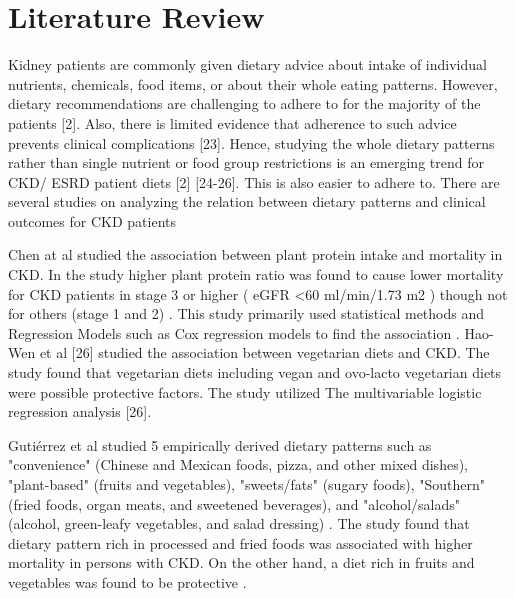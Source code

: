 \section*{Literature Review}

Kidney patients are commonly given dietary advice about intake of individual nutrients, chemicals, food items, or about their whole eating patterns. However, dietary recommendations are challenging to adhere to for the majority of the patients [2]. Also, there is limited evidence that adherence to such advice prevents clinical complications [23]. Hence, studying the whole dietary patterns rather than single nutrient or food group restrictions is an emerging trend for CKD/ ESRD patient diets [2] [24-26]. This is also easier to adhere to. There are several studies on analyzing the relation between dietary patterns and clinical outcomes for CKD patients \cite{Jaceketal2017} \cite{Chenetal2016}  \cite{Gutierreztal2014}   \cite{Huangetal2013}   \cite{Muntneretal2013}  \cite{Ricardoetal2013} \cite{Tsuruyaetal2015}   \cite{Ricardoetal2015} 

\noindent Chen at al \cite{Chenetal2016} studied the association between plant protein intake and mortality in CKD. In the study higher plant protein ratio was found to cause lower mortality for CKD patients in stage 3 or higher ( eGFR  \textless 60 ml/min/1.73 m2 ) though not for others (stage 1 and 2) \cite{Chenetal2016}. This study primarily used statistical methods and Regression Models such as Cox regression models to find the association \cite{Chenetal2016}. Hao-Wen et al [26] studied the association between vegetarian diets and CKD. The study found that vegetarian diets including vegan and ovo-lacto vegetarian diets were possible protective factors. The study utilized The multivariable logistic regression analysis [26].

\noindent Gutiérrez et al \cite{Gutierreztal2014} studied 5 empirically derived dietary patterns such as "convenience" (Chinese and Mexican foods, pizza, and other mixed dishes), "plant-based" (fruits and vegetables), "sweets/fats" (sugary foods), "Southern" (fried foods, organ meats, and sweetened beverages), and "alcohol/salads" (alcohol, green-leafy vegetables, and salad dressing) \cite{Gutierreztal2014}. The study found that dietary pattern rich in processed and fried foods was associated with higher mortality in persons with CKD. On the other hand, a diet rich in fruits and vegetables was found to be protective \cite{Gutierreztal2014}.

